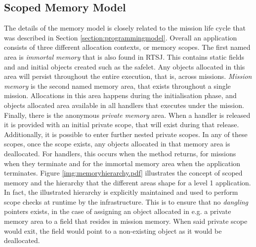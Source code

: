 \subsection{Scoped Memory Model} %
\label{sub:scoped_memory_model}
The details of the memory model is closely related to the mission life cycle that was described in Section \ref{section:programmingmodel}. Overall an application consists of three different allocation contexts, or memory scopes. The first named area is \textit{immortal memory} that is also found in RTSJ. This contains static fields and and initial objects created such as the safelet. Any objects allocated in this area will persist throughout the entire execution, that is, across missions. \textit{Mission memory} is the second named memory area, that exists throughout a single mission. Allocations in this area happens during the initialisation phase, and objects allocated area available in all handlers that executes under the mission. Finally, there is the anonymous \textit{private memory} area. When a handler is released it is provided with an initial private scope, that will exist during that release. Additionally, it is possible to enter further nested private scopes. In any of these scopes, once the scope exists, any objects allocated in that memory area is deallocated. For handlers, this occurs when the  method returns, for missions when they terminate and for the immortal memory area when the application terminates. Figure \ref{img:memoryhierarchy.pdf} illustrates the concept of scoped memory and the hierarchy that the different areas shape for a level 1 application.
In fact, the illustrated hierarchy is explicitly maintained and used to perform scope checks at runtime by the infrastructure. This is to ensure that no \textit{dangling} pointers exists, in the case of assigning an object allocated in e.g. a private memory area to a field that resides in mission memory. When said private scope would exit, the field would point to a non-existing object as it would be deallocated.

